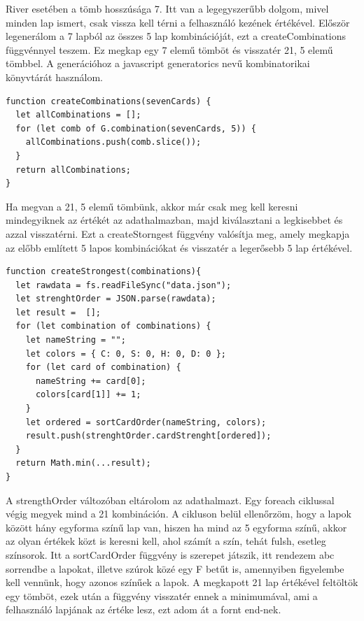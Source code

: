 River esetében a tömb hosszúsága 7. Itt van a legegyszerűbb dolgom, mivel minden lap ismert, csak vissza kell térni a felhasználó kezének értékével. Először legenerálom a 7 lapból az összes 5 lap kombinációját, ezt a createCombinations függvénnyel teszem. Ez megkap egy 7 elemű tömböt és visszatér 21, 5 elemű tömbbel. A generációhoz a javascript generatorics nevű kombinatorikai könyvtárát használom.

\newpage

\begin{lstlisting}[style=htmlcssjs]
function createCombinations(sevenCards) {
  let allCombinations = [];
  for (let comb of G.combination(sevenCards, 5)) {
    allCombinations.push(comb.slice());
  }
  return allCombinations;
}
\end{lstlisting}

Ha megvan a 21, 5 elemű tömbünk, akkor már csak meg kell keresni mindegyiknek az értékét az adathalmazban, majd kiválasztani a legkisebbet és azzal visszatérni. Ezt a createStorngest függvény valósítja meg, amely megkapja az előbb említett 5 lapos kombinációkat és visszatér a legerősebb 5 lap értékével.

\begin{lstlisting}[style=htmlcssjs]
function createStrongest(combinations){
  let rawdata = fs.readFileSync("data.json");
  let strenghtOrder = JSON.parse(rawdata);
  let result =  [];
  for (let combination of combinations) {
    let nameString = "";
    let colors = { C: 0, S: 0, H: 0, D: 0 };
    for (let card of combination) {
      nameString += card[0];
      colors[card[1]] += 1;
    }
    let ordered = sortCardOrder(nameString, colors);
    result.push(strenghtOrder.cardStrenght[ordered]);
  }
  return Math.min(...result);
}
\end{lstlisting}

A strengthOrder változóban eltárolom az adathalmazt. Egy foreach ciklussal végig megyek mind a 21 kombináción. A cikluson belül ellenőrzöm, hogy a lapok között hány egyforma színű lap van, hiszen ha mind az 5 egyforma színű, akkor az olyan értékek közt is keresni kell, ahol számít a szín, tehát fulsh, esetleg színsorok. Itt a sortCardOrder függvény is szerepet játszik, itt rendezem abc sorrendbe a lapokat, illetve szúrok közé egy F betűt is, amennyiben figyelembe kell vennünk, hogy azonos színűek a lapok. A megkapott 21 lap értékével feltöltök egy tömböt, ezek után a függvény visszatér ennek a minimumával, ami a felhasználó lapjának az értéke lesz, ezt adom át a fornt end-nek.

